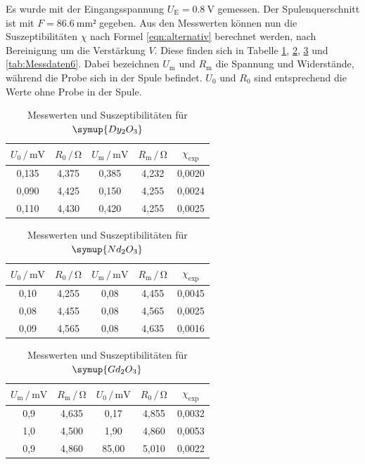 Es wurde mit der Eingangsspannung $U_\text{E} = \SI{0.8}{\volt}$ gemessen. Der 
Spulenquerschnitt ist mit $F = \SI{86.6}{\milli\meter²}$ gegeben. Aus den Messwerten 
können nun die Suszeptibilitäten $\chi$ nach Formel \eqref{eqn:alternativ} berechnet werden, nach Bereinigung 
um die Verstärkung $V$. Diese finden sich in Tabelle \ref{tab:Messdaten3}, 
\ref{tab:Messdaten4}, \ref{tab:Messdaten5} und \ref{tab:Messdaten6}.
Dabei bezeichnen $U_\text{m}$ und $R_\text{m}$ die Spannung und Widerstände, 
während die Probe sich in der Spule befindet. $U_\text{0}$ und $R_\text{0}$
sind entsprechend die Werte ohne Probe in der Spule. 

\begin{table}
\centering
\caption{Messwerten und Suszeptibilitäten für $\symup{Dy_2O_3}$}
\label{tab:Messdaten3}
\begin{tabular}{c c c c c}
\toprule
$U_\text{0} \,/\, \si{\milli\volt}$ & $R_\text{0} \,/\, \si{\ohm}$ & $U_\text{m} \,/\, \si{\milli\volt}$& $R_\text{m} \,/\, \si{\ohm}$ & $\chi _\text{exp}$ \\
\midrule
0,135 & 4,375 & 0,385 & 4,232 & 0,0020\\
0,090 & 4,425 & 0,150 & 4,255 & 0,0024\\
0,110 & 4,430 & 0,420 & 4,255 & 0,0025\\ 
\bottomrule
\end{tabular}
\end{table}

\begin{table}
\centering
\caption{Messwerten und Suszeptibilitäten für $\symup{Nd_2O_3}$}
\label{tab:Messdaten4}
\begin{tabular}{c c c c c}
\toprule
$U_\text{0} \,/\, \si{\milli\volt}$ & $R_\text{0} \,/\, \si{\ohm}$ & $U_\text{m} \,/\, \si{\milli\volt}$& $R_\text{m} \,/\, \si{\ohm}$ & $\chi _\text{exp}$ \\
\midrule
0,10 & 4,255 & 0,08 & 4,455 & 0,0045\\
0,08 & 4,455 & 0,08 & 4,565 & 0,0025\\
0,09 & 4,565 & 0,08 & 4,635 & 0,0016\\
\bottomrule
\end{tabular}
\end{table}

\begin{table}
\centering
\caption{Messwerten und Suszeptibilitäten für $\symup{Gd_2O_3}$}
\label{tab:Messdaten5}
\begin{tabular}{c c c c c}
\toprule
$U_\text{m} \,/\, \si{\milli\volt}$ & $R_\text{m} \,/\, \si{\ohm}$ & $U_\text{0} \,/\, \si{\milli\volt}$& $R_\text{0} \,/\, \si{\ohm}$ & $\chi _\text{exp}$ \\
\midrule
0,9 & 4,635 &  0,17 & 4,855 & 0,0032\\
1,0 & 4,500 &  1,90 & 4,860 & 0,0053\\
0,9 & 4,860 & 85,00 & 5,010 & 0,0022\\
\bottomrule
\end{tabular}
\end{table}

